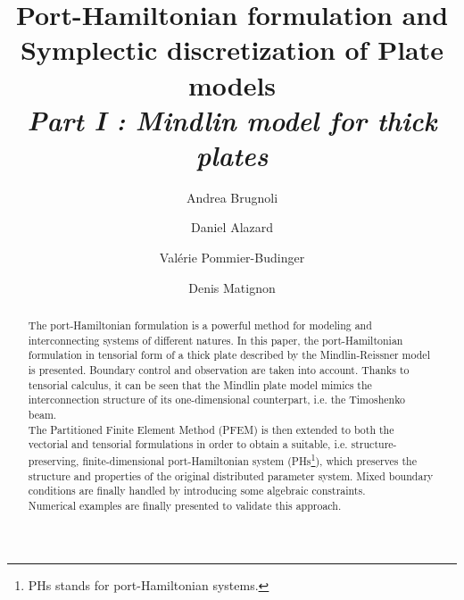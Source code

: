 \documentclass[preprint,12pt]{elsarticle}
\begin{document}
	
	\begin{frontmatter}	
		
		\title{Port-Hamiltonian formulation and \\ Symplectic discretization of Plate models \\
		\vspace{2mm}\large\textit{Part I : Mindlin model for thick plates}}	
		\author[ISAE]{Andrea Brugnoli}
		
		\author[ISAE]{Daniel Alazard}
		
		\author[ISAE]{Valérie Pommier-Budinger}
		
		\author[ISAE]{Denis Matignon}
		
		
		
		\address[ISAE]{ISAE-SUPAERO, Universit\'e de Toulouse, France.\\
		\vspace{2mm} {10 Avenue Edouard Belin, BP-54032, 31055 Toulouse Cedex 4.}}
		
		\begin{abstract}
		The port-Hamiltonian formulation is a powerful method  for modeling and interconnecting systems of different natures. In this paper, the port-Hamiltonian formulation in tensorial form of a thick plate described  by the Mindlin-Reissner model is presented. Boundary control and observation are taken into account. Thanks to tensorial calculus, it can be seen that the Mindlin plate model mimics the interconnection structure of its one-dimensional counterpart, i.e. the Timoshenko beam.\\
        The Partitioned Finite Element Method (PFEM) is then extended to both the vectorial and tensorial formulations in order to obtain a suitable, i.e. structure-preserving, finite-dimensional port-Hamiltonian system (PHs\footnote{PHs stands for port-Hamiltonian systems.}), which preserves the structure and properties of the original distributed parameter system. Mixed boundary conditions are finally handled by introducing some algebraic constraints. \\
        Numerical examples are finally presented to validate this approach. 
		\end{abstract}
		

\end{frontmatter}
\end{document}
